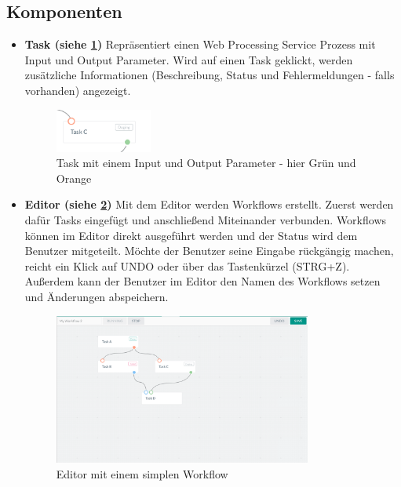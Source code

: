         \subsection{Komponenten}
        
        \begin{itemize}
        
            \item \textbf{Task (siehe \ref{fig:Task})} \newline 
            Repräsentiert einen \Gls{Web Processing Service} Prozess mit Input und Output Parameter. Wird auf einen Task geklickt, werden zusätzliche Informationen (Beschreibung, Status und Fehlermeldungen - falls vorhanden) angezeigt.
            
            \begin{figure}[h]
            \centering
            \includegraphics[width=0.3\textwidth]{images/ui_task.png}
            \caption{Task mit einem Input und Output Parameter - hier Grün und Orange}
            \label{fig:Task}
            \end{figure}

            \item \textbf{Editor (siehe \ref{fig:Editor})} \newline 
            Mit dem Editor werden Workflows erstellt. Zuerst werden dafür Tasks eingefügt und anschließend Miteinander verbunden.
            Workflows können im Editor direkt ausgeführt werden und der Status wird dem Benutzer mitgeteilt. Möchte der Benutzer seine Eingabe rückgängig machen, reicht ein Klick auf UNDO oder über das Tastenkürzel (STRG+Z).
            Außerdem kann der Benutzer im Editor den Namen des Workflows setzen und Änderungen abspeichern.
            
            \begin{figure}[h]
            \centering
            \includegraphics[width=0.8\textwidth]{images/ui_editor.png}
            \caption{Editor mit einem simplen Workflow}
            \label{fig:Editor}
            \end{figure}
            

\end{itemize}
